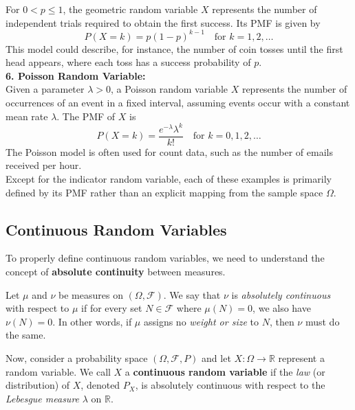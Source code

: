 For \( 0 < p \leq 1 \), the geometric random variable \( X \) represents the number of independent trials required to obtain the first success. Its PMF is given by
\[
P(X = k) = p (1 - p)^{k - 1} \quad \text{for } k = 1, 2, \dots
\]
This model could describe, for instance, the number of coin tosses until the first head appears, where each toss has a success probability of \( p \).\\

\textbf{6. Poisson Random Variable:}  \\

Given a parameter \( \lambda > 0 \), a Poisson random variable \( X \) represents the number of occurrences of an event in a fixed interval, assuming events occur with a constant mean rate \( \lambda \). The PMF of \( X \) is
\[
P(X = k) = \frac{e^{-\lambda} \lambda^k}{k!} \quad \text{for } k = 0, 1, 2, \dots
\]
The Poisson model is often used for count data, such as the number of emails received per hour.\\

Except for the indicator random variable, each of these examples is primarily defined by its PMF rather than an explicit mapping from the sample space \( \Omega \). 

\subsection{Continuous Random Variables}

To properly define continuous random variables, we need to understand the concept of \textbf{absolute continuity} between measures.

\begin{definition}
    Let \(\mu\) and \(\nu\) be measures on \((\Omega, \mathcal{F})\). We say that \(\nu\) is \textit{absolutely continuous} with respect to \(\mu\) if for every set \(N \in \mathcal{F}\) where \(\mu(N) = 0\), we also have \(\nu(N) = 0\). In other words, if \(\mu\) assigns no \textit{weight or size} to \(N\), then \(\nu\) must do the same.
\end{definition}

Now, consider a probability space \((\Omega, \mathcal{F}, P)\) and let \(X : \Omega \to \mathbb{R}\) represent a random variable. We call \(X\) a \textbf{continuous random variable} if the \textit{law} (or distribution) of \(X\), denoted \(P_X\), is absolutely continuous with respect to the \textit{Lebesgue measure} \(\lambda\) on \(\mathbb{R}\).\\

